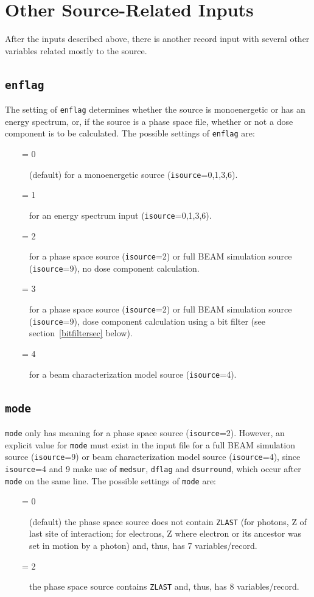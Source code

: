 \documentclass[12pt,twoside]{article}      %
\newcommand{\indexm}[1]{\index{#1}}
\begin{document}
\rfoot[{\sffamily \rightmark}]{{\sffamily \leftmark}}

\section{Other Source-Related Inputs}
\label{sec5}
After the inputs described above, there is another record input with
several other variables related mostly to the source.

\indexm{enflag}
\subsection {{\tt enflag}}
\label{enflag_sect}
The setting of {\tt enflag} determines whether the source is monoenergetic
or has an energy spectrum, or, if the source is a phase space file, whether
or not a dose component is to be calculated.
The possible settings of {\tt enflag} are:
\begin{description}
\item [~~~~= 0] (default) for a monoenergetic source ({\tt isource}=0,1,3,6).
\item [~~~~= 1] for an energy spectrum input ({\tt isource}=0,1,3,6).
\item [~~~~= 2] for a phase space source ({\tt isource}=2) or
full BEAM simulation source ({\tt isource}=9), no dose component
calculation.
\item [~~~~= 3] for a phase space source ({\tt isource}=2) or
full BEAM simulation source ({\tt isource}=9), dose component
calculation using a bit filter (see section~\ref{bitfiltersec} below).
\item [~~~~= 4] for a beam characterization model source ({\tt isource}=4).
\end{description}

\subsection {{\tt mode}}
\indexm{mode}
{\tt mode} only has meaning for a phase space source ({\tt isource}=2).
However, an explicit value for {\tt mode} must exist in the input file
for a full BEAM simulation source ({\tt isource}=9) or
beam characterization model source ({\tt isource}=4), since
{\tt isource}=4 and 9 make use of {\tt medsur}, {\tt dflag} and {\tt dsurround},
which occur after {\tt mode} on the same line.
The possible settings of {\tt mode} are:
\begin{description}
\item [~~~~= 0] (default) the phase space source does not contain
{\tt ZLAST} (for photons, Z of last site of interaction; for electrons,
Z where electron or its ancestor was set in motion by a photon) and, thus,
has 7 variables/record.
\item [~~~~= 2] the phase space source contains {\tt ZLAST} and, thus,
has 8 variables/record.
\end{description}
\end{document}
